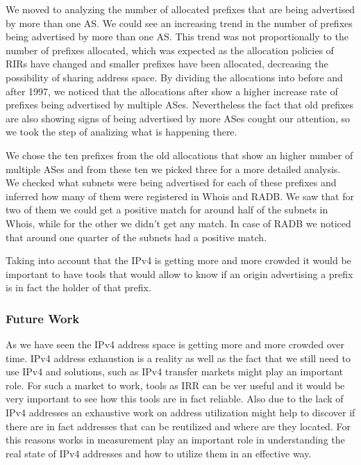 \documentclass[11pt,a4paper]{scrreprt}
\begin{document}
We moved to analyzing the number of allocated prefixes that are being advertised by more than one AS. We could see an increasing trend in the number of prefixes being advertised by more than one AS. This trend was not proportionally to the number of prefixes allocated, which was expected as the allocation policies of RIRs have changed and smaller prefixes have been allocated, decreasing the possibility of sharing address space. By dividing the allocations into before and after 1997, we noticed that the allocations after show a higher increase rate of prefixes being advertised by multiple ASes. Nevertheless the fact that old prefixes are also showing signs of being advertised by more ASes cought our attention, so we took the step of analizing what is happening there.

We chose the ten prefixes from the old allocations that show an higher number of multiple ASes and from these ten we picked three for a more detailed analysis. We checked what subnets were being advertised for each of these prefixes and inferred how many of them were registered in Whois and RADB. We saw that for two of them we could get a positive match for around half of the subnets in Whois, while for the other we didn't get any match. In case of RADB we noticed that around one quarter of the subnets had a positive match. 

Taking into account that the IPv4 is getting more and more crowded it would be important to have tools that would allow to know if an origin advertising a prefix is in fact the holder of that prefix.  

\subsubsection{Future Work}

As we have seen the IPv4 address space is getting more and more crowded over time. IPv4 address exhaustion is a reality as well as the fact that we still need to use IPv4 and solutions, such as IPv4 transfer markets might play an important role. For such a market to work, tools as IRR can be ver useful and it would be very important to see how this tools are in fact reliable. Also due to the lack of IPv4 addresses an exhaustive work on address utilization might help to discover if there are in fact addresses that can be reutilized and where are they located.
For this reasons works in measurement play an important role in understanding the real state of IPv4 addresses and how to utilize them in an effective way.
\end{document}

